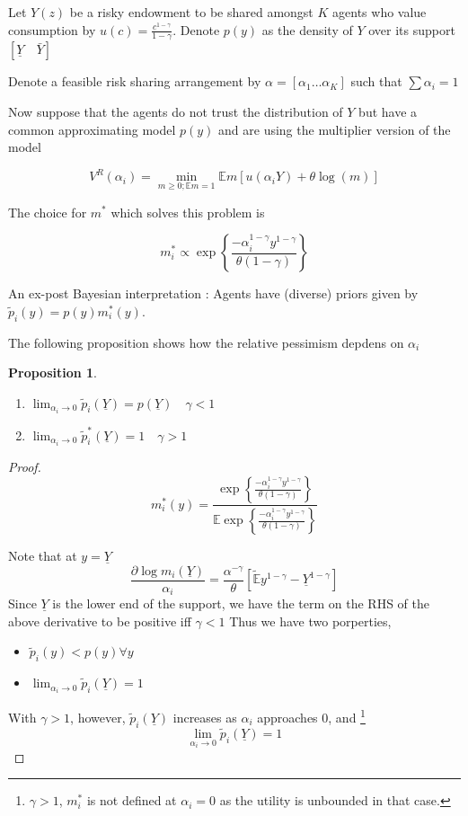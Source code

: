 \documentclass[12pt]{article}
\newtheorem{proposition}{Proposition}
\begin{document}
\noindent Let $Y(z)$ be a risky endowment to be shared amongst $K$ agents who value consumption by $u(c)=\frac{c^{1-\gamma}}{1-\gamma}$. Denote $p(y)$ as the density of $Y$ over its support $[\underline{Y} \quad \bar{Y}]$

\noindent  Denote a feasible risk sharing arrangement by $\alpha = [\alpha_1 \dots \alpha_K]$ such that $\sum \alpha_i=1$

\noindent  Now suppose that the agents do not trust the distribution of $Y$ but have a common approximating model $p(y)$ and are using the multiplier version of the model

\[V^R (\alpha_i)=\min_{m \geq0;\mathbb{E}m=1}\mathbb{E}m[u(\alpha_iY)+\theta\log(m)]\]

\noindent  The choice for $m^*$ which solves this problem is

\[m_i^*\propto \exp\left\{\frac {-\alpha^{1-\gamma}_iy^{1-\gamma}}{\theta(1-\gamma)}\right\}\]

\noindent An ex-post Bayesian interpretation : Agents have (diverse) priors given by $\tilde{p}_i(y)=p(y)m^*_i(y)$. 

\noindent  The following proposition shows how the relative pessimism depdens on $\alpha_i$

\begin{proposition}
\label{propo-1}
\begin{enumerate}
	\item $\lim_{\alpha_i \to 0} \tilde{p}_i(\underline{Y})=p(\underline{Y}) \quad \gamma < 1$
	\item $\lim_{\alpha_i \to 0} \tilde{p}_i^*(\underline{Y})=1  \quad \gamma > 1$
\end{enumerate}
\end{proposition}
\begin{proof}
\[m^*_i(y)=\frac{\exp\left\{\frac {-\alpha^{1-\gamma}_iy^{1-\gamma}}{\theta(1-\gamma)}\right\} }{\mathbb{E}\exp\left\{\frac {-\alpha^{1-\gamma}_iy^{1-\gamma}}{\theta(1-\gamma)}\right\} }\]

Note that at $y=\underline{Y}$
\[\frac{\partial \log m_i(\underline{Y}) }{\alpha_i} = \frac{\alpha^{-\gamma}}{\theta}\left[ \tilde{\mathbb{E}} y^{1-\gamma} -\underline{Y}^{1-\gamma}\right]\]
Since $\underline {Y} $ is the lower end of the support, we have the term on the RHS of the above derivative to be positive iff $\gamma < 1$ Thus we have two porperties,
	\begin{itemize}
          \item $\tilde{p}_i(y) < p(y) \forall y$
          \item $\lim_{\alpha_i \to 0} \tilde{p}_i(\underline{Y})=1$
         \end{itemize}

With $\gamma > 1$, however, $\tilde{p}_i(\underline{Y})$ increases as $\alpha_i$ approaches 0, and \footnote{$\gamma > 1$, $m^*_i$ is not defined at $\alpha_i=0$ as the utility is unbounded in that case.} 
\[\lim_{\alpha_i \to 0}\tilde{p}_i(\underline{Y}) = 1\]



\end{proof}
\end{document}
